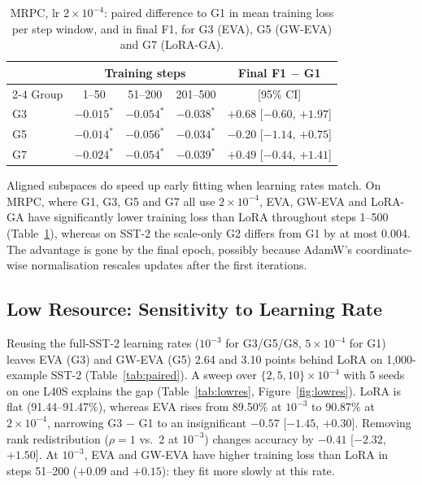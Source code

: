 \documentclass[letterpaper]{article} %
\begin{document}
\begin{table}[t]
\centering
\small
\setlength{\tabcolsep}{2.5pt}
\begin{tabular}{@{}lcccc@{}}
\toprule
 & \multicolumn{3}{c}{Training steps} & Final F1 $-$ G1 \\
\cmidrule(lr){2-4}
Group & 1--50 & 51--200 & 201--500 & [95\% CI] \\
\midrule
G3 & $-0.015^{*}$ & $-0.054^{*}$ & $-0.038^{*}$ & $+0.68$ [$-0.60$, $+1.97$] \\
G5 & $-0.014^{*}$ & $-0.056^{*}$ & $-0.034^{*}$ & $-0.20$ [$-1.14$, $+0.75$] \\
G7 & $-0.024^{*}$ & $-0.054^{*}$ & $-0.039^{*}$ & $+0.49$ [$-0.44$, $+1.41$] \\
\bottomrule
\end{tabular}
\caption{MRPC, lr $2\times10^{-4}$: paired difference to G1 in mean training loss per step window, and in final F1, for G3 (EVA), G5 (GW-EVA) and G7 (LoRA-GA).}
\label{tab:loss}
\end{table}

Aligned subspaces do speed up early fitting when learning rates match. On MRPC, where G1, G3, G5 and G7 all use $2\times10^{-4}$, EVA, GW-EVA and LoRA-GA have significantly lower training loss than LoRA throughout steps 1--500 (Table~\ref{tab:loss}), whereas on SST-2 the scale-only G2 differs from G1 by at most 0.004. The advantage is gone by the final epoch, possibly because AdamW's coordinate-wise normalisation rescales updates after the first iterations.


\subsection{Low Resource: Sensitivity to Learning Rate}

Reusing the full-SST-2 learning rates ($10^{-3}$ for G3/G5/G8, $5\times10^{-4}$ for G1) leaves EVA (G3) and GW-EVA (G5) 2.64 and 3.10 points behind LoRA on 1,000-example SST-2 (Table~\ref{tab:paired}). A sweep over $\{2,5,10\}\times10^{-4}$ with 5 seeds on one L40S explains the gap (Table~\ref{tab:lowres}, Figure~\ref{fig:lowres}). LoRA is flat (91.44--91.47\%), whereas EVA rises from 89.50\% at $10^{-3}$ to 90.87\% at $2\times10^{-4}$, narrowing G3 $-$ G1 to an insignificant $-0.57$ [$-1.45$, $+0.30$]. Removing rank redistribution ($\rho=1$ vs.\ 2 at $10^{-3}$) changes accuracy by $-0.41$ [$-2.32$, $+1.50$]. At $10^{-3}$, EVA and GW-EVA have higher training loss than LoRA in steps 51--200 ($+0.09$ and $+0.15$): they fit more slowly at this rate.
\end{document}

